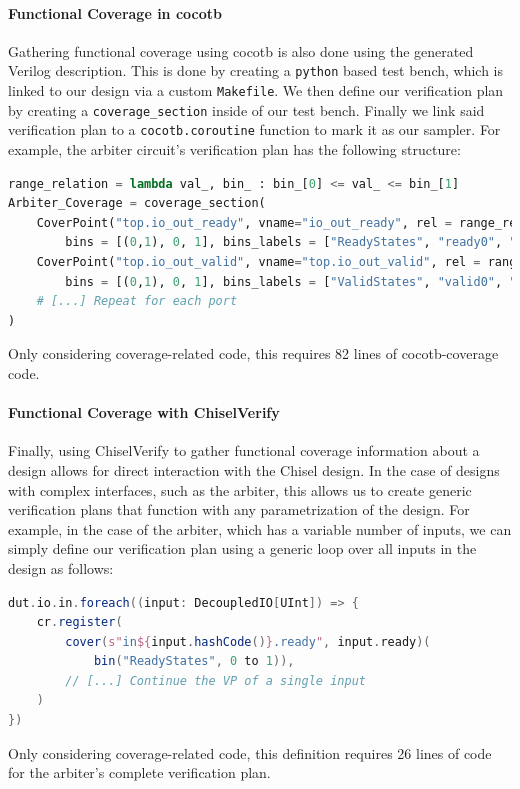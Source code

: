 \documentclass[conference]{IEEEtran}
\begin{document}
\paragraph{Functional Coverage in cocotb} Gathering functional coverage using cocotb is also done using the generated Verilog description.
This is done by creating a \texttt{python} based test bench, which is linked to our design via a custom \texttt{Makefile}.
We then define our verification plan by creating a \texttt{coverage\_section} inside of our test bench.
Finally we link said verification plan to a \texttt{cocotb.coroutine} function to mark it as our sampler.
For example, the arbiter circuit's verification plan has the following structure:
 \begin{lstlisting}[language=python]
 range_relation = lambda val_, bin_ : bin_[0] <= val_ <= bin_[1]
Arbiter_Coverage = coverage_section(
    CoverPoint("top.io_out_ready", vname="io_out_ready", rel = range_relation, 
        bins = [(0,1), 0, 1], bins_labels = ["ReadyStates", "ready0", "ready1"]),
    CoverPoint("top.io_out_valid", vname="top.io_out_valid", rel = range_relation, 
        bins = [(0,1), 0, 1], bins_labels = ["ValidStates", "valid0", "valid1"]),
    # [...] Repeat for each port
)
 \end{lstlisting}
 Only considering coverage-related code, this requires 82 lines of cocotb-coverage code.
 
\paragraph{Functional Coverage with ChiselVerify} Finally, using ChiselVerify to gather functional coverage information about a design allows for direct interaction with the Chisel design.
In the case of designs with complex interfaces, such as the arbiter, this allows us to create generic verification plans that function with any parametrization of the design.
For example, in the case of the arbiter, which has a variable number of inputs, we can simply define our verification plan using a generic loop over all inputs in the design as follows:
 \begin{lstlisting}[language=scala]
dut.io.in.foreach((input: DecoupledIO[UInt]) => {
    cr.register(
        cover(s"in${input.hashCode()}.ready", input.ready)(
            bin("ReadyStates", 0 to 1)),
        // [...] Continue the VP of a single input
    )
})
 \end{lstlisting}
Only considering coverage-related code, this definition requires 26 lines of code for the arbiter's complete verification plan.
\end{document}
